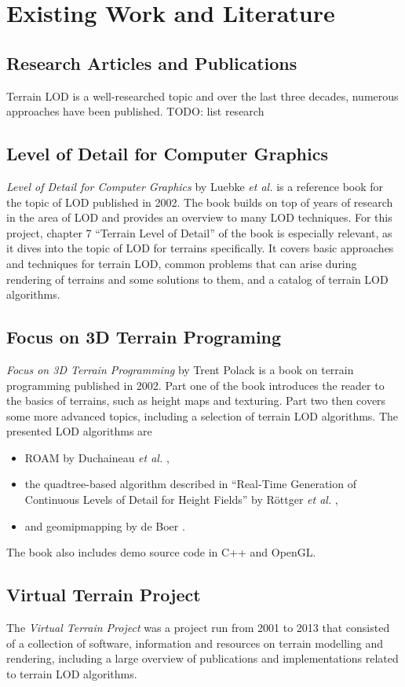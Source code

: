\chapter{Existing Work and Literature}
\section{Research Articles and Publications}
Terrain LOD is a well-researched topic and over the last three decades, numerous approaches have been published.
TODO: list research

\section{Level of Detail for Computer Graphics}
\textit{Level of Detail for Computer Graphics} by Luebke \textit{et al.} \cite{lodfor3dgraphics} 
is a reference book for the topic of 
LOD published in 2002. The book builds on top of years of research in the 
area of LOD and provides an overview to many LOD techniques. For this project,
chapter 7 ``Terrain Level of Detail'' of the book is especially relevant, 
as it dives into the topic of LOD for terrains specifically.
It covers basic approaches and techniques for terrain LOD, 
common problems that can arise during rendering of terrains and some solutions to them, 
and a catalog of terrain LOD algorithms.

\section{Focus on 3D Terrain Programing}
\textit{Focus on 3D Terrain Programming} by Trent Polack \cite{focuson3dterrainprogramming} is a book on terrain programming published in 2002.
Part one of the book introduces the reader to the basics of terrains, such as height maps and texturing. Part two then 
covers some more advanced topics, including a selection of terrain LOD algorithms. The presented LOD algorithms are
\begin{itemize}
  \item ROAM by Duchaineau \textit{et al.} \cite{roam},
  \item the quadtree-based algorithm described in ``Real-Time Generation of Continuous Levels of Detail for Height Fields'' by Röttger \textit{et al.} \cite{rottgerpaper},
  \item and geomipmapping by de Boer \cite{geomipmapping}.
\end{itemize}
The book also includes demo source code in C++ and OpenGL.

\section{Virtual Terrain Project}
The \textit{Virtual Terrain Project} \cite{vtp} was a project run from 2001 to 2013 
that consisted of a collection of software, information and resources on terrain modelling and rendering,
including a large overview of publications and implementations related to terrain LOD algorithms.
